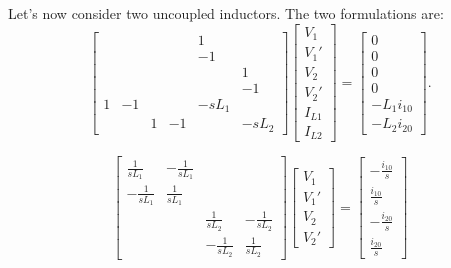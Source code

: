 \documentclass[a4paper, 12pt]{article}
\begin{document}
Let's now consider two uncoupled inductors.  The two formulations are:
%
\begin{equation}
  \begin{bmatrix}
     &  &  &    &  1 & \\
     &  &  &    & -1 & \\
     &  &  &    &    & 1\\
     &  &  &    &    & -1\\
1 & -1  &  &    & -sL_1 & \\
     &  & 1 & -1 &  & -sL_2
  \end{bmatrix}
  \begin{bmatrix}
    V_1 \\ V_1' \\ V_2 \\ V_2' \\ I_{L1} \\ I_{L2}
  \end{bmatrix}
=
\begin{bmatrix}
  0 \\ 0 \\ 0 \\ 0 \\ -L_1 i_{10} \\ -L_2 i_{20}
\end{bmatrix}.
\label{eqn:L1L2_stamp1}
\end{equation}


\begin{equation}
  \begin{bmatrix}
    \frac{1}{sL_1} & -\frac{1}{sL_1} &   & \\
   -\frac{1}{sL_1} & \frac{1}{sL_1}  &   & \\
   & &  \frac{1}{sL_2} & -\frac{1}{sL_2}   \\
   & & -\frac{1}{sL_2} & \frac{1}{sL_2}  
  \end{bmatrix}
  \begin{bmatrix}
    V_1 \\ V_1' \\ V_2 \\ V_2'
  \end{bmatrix}
=
\begin{bmatrix}
  -\frac{i_{10}}{s} \\ \frac{i_{10}}{s} \\
  -\frac{i_{20}}{s} \\ \frac{i_{20}}{s}
\end{bmatrix}
\label{eqn:L1L2_stamp2}
\end{equation}
\end{document}
